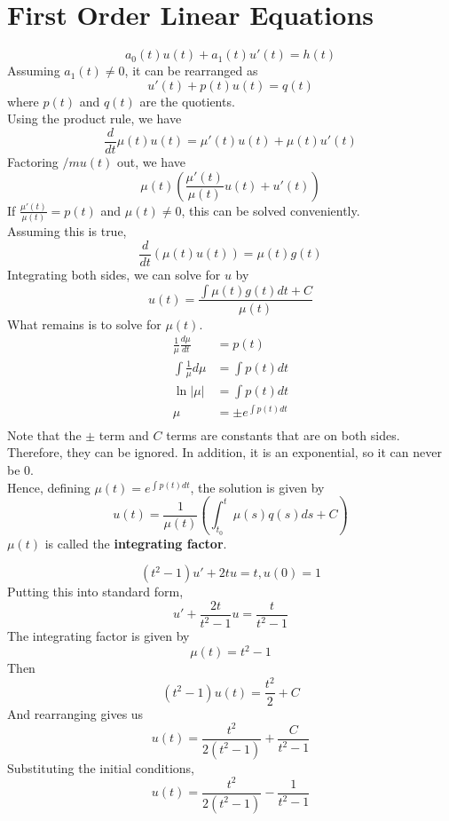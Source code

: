 \documentclass[12pt]{article}
\begin{document}
\section{First Order Linear Equations}
$$a_0(t)u(t) + a_1(t)u'(t) = h(t)$$
Assuming $a_1(t) \neq 0$, it can be rearranged as
$$u'(t) + p(t)u(t) = q(t)$$
where $p(t)$ and $q(t)$ are the quotients. \\
Using the product rule, we have
$$\frac{d}{dt} \mu(t)u(t) = \mu'(t)u(t) + \mu(t)u'(t)$$
Factoring $/mu(t)$ out, we have
$$\mu(t)\left(\frac{\mu'(t)}{\mu(t)}u(t) + u'(t)\right)$$
If $\frac{\mu'(t)}{\mu(t)} = p(t)$ and $\mu(t) \neq 0$, this can be solved conveniently. \\
Assuming this is true,
$$\frac{d}{dt} (\mu(t)u(t)) = \mu(t)g(t)$$
Integrating both sides, we can solve for $u$ by
$$u(t) = \frac{\int \mu(t)g(t)dt + C}{\mu(t)}$$
What remains is to solve for $\mu(t)$.
\begin{align*}
	\frac{1}{\mu} \frac{d\mu}{dt} &= p(t) \\
	\int \frac{1}{\mu} d\mu &= \int p(t) dt \\
	\ln|\mu| &= \int p(t) dt \\
	\mu &= \pm e^{\int p(t)dt} \\
\end{align*}
	Note that the $\pm$ term and $C$ terms are constants that are on both sides. Therefore, they can be ignored. In addition, it is an exponential, so it can never be $0$. \\
Hence, defining $\mu(t) = e^{\int p(t)dt}$, the solution is given by
$$u(t) = \frac{1}{\mu(t)} \left(\int_{t_0}^t \mu(s) q(s) ds + C\right)$$
$\mu(t)$ is called the \textbf{integrating factor}.

\begin{ex}
	$$(t^2-1)u' + 2tu = t, u(0) = 1$$
	Putting this into standard form,
	$$u' + \frac{2t}{t^2-1} u = \frac{t}{t^2-1}$$
	The integrating factor is given by
	$$\mu(t) = t^2 - 1$$
	Then
	$$(t^2-1)u(t) = \frac{t^2}{2} + C$$
	And rearranging gives us
	$$u(t) = \frac{t^2}{2(t^2-1)} + \frac{C}{t^2-1}$$
	Substituting the initial conditions,
	$$u(t) = \frac{t^2}{2(t^2-1)} - \frac{1}{t^2-1}$$
\end{ex}
\end{document}
